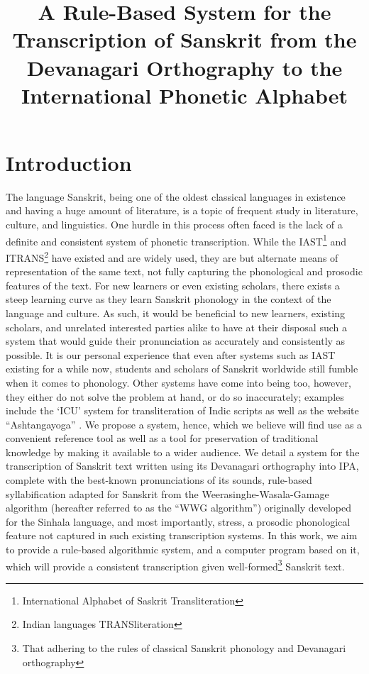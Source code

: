 \documentclass[10pt,a4paper]{article}
\title{A Rule-Based System for the Transcription of Sanskrit from the Devanagari Orthography to the International Phonetic Alphabet}
\begin{document}
\maketitleabstract

\section{Introduction}

The language Sanskrit, being one of the oldest classical languages in existence and having a huge amount of literature, is a topic of frequent study in literature, culture, and linguistics. One hurdle in this process often faced is the lack of a definite and consistent system of phonetic transcription. While the IAST\footnote{International Alphabet of Saskrit Transliteration} and ITRANS\footnote{Indian languages TRANSliteration} have existed and are widely used, they are but alternate means of representation of the same text, not fully capturing the phonological and prosodic features of the text. For new learners or even existing scholars, there exists a steep learning curve as they learn Sanskrit phonology in the context of the language and culture. As such, it would be beneficial to new learners, existing scholars, and unrelated interested parties alike to have at their disposal such a system that would guide their pronunciation as accurately and consistently as possible. It is our personal experience that even after systems such as IAST existing for a while now, students and scholars of Sanskrit worldwide still fumble when it comes to phonology. Other systems have come into being too, however, they either do not solve the problem at hand, or do so inaccurately; examples include the `ICU' system for transliteration of Indic scripts \cite{viswanadha2002transliteration} as well as the website ``Ashtangayoga'' \cite{ashtangayoga}. We propose a system, hence, which we believe will find use as a convenient reference tool as well as a tool for preservation of traditional knowledge by making it available to a wider audience. We detail a system for the transcription of Sanskrit text written using its Devanagari orthography into IPA, complete with the best-known pronunciations of its sounds, rule-based syllabification adapted for Sanskrit from the Weerasinghe-Wasala-Gamage algorithm (hereafter referred to as the ``WWG algorithm'') originally developed for the Sinhala language, and most importantly, stress, a prosodic phonological feature not captured in such existing transcription systems.
In this work, we aim to provide a rule-based algorithmic system, and a computer program based on it, which will provide a consistent transcription given well-formed\footnote{That adhering to the rules of classical Sanskrit phonology and Devanagari orthography} Sanskrit text.
\end{document}
